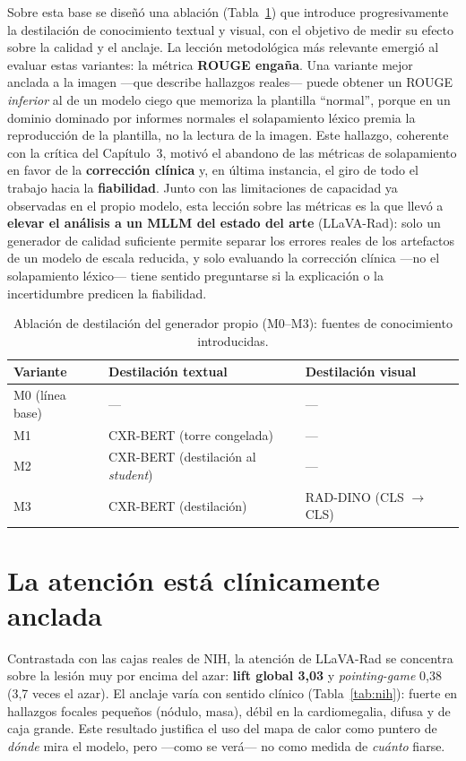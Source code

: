 Sobre esta base se diseñó una ablación (Tabla~\ref{tab:ablacion}) que introduce progresivamente la
destilación de conocimiento textual y visual, con el objetivo de medir su efecto sobre la calidad y el
anclaje. La lección metodológica más relevante emergió al evaluar estas variantes: la métrica
\textbf{ROUGE engaña}. Una variante mejor anclada a la imagen —que describe hallazgos reales— puede
obtener un ROUGE \emph{inferior} al de un modelo ciego que memoriza la plantilla ``normal'', porque en
un dominio dominado por informes normales el solapamiento léxico premia la reproducción de la
plantilla, no la lectura de la imagen. Este hallazgo, coherente con la crítica del Capítulo~3, motivó
el abandono de las métricas de solapamiento en favor de la \textbf{corrección clínica} y, en última
instancia, el giro de todo el trabajo hacia la \textbf{fiabilidad}. Junto con las limitaciones de
capacidad ya observadas en el propio modelo, esta lección sobre las métricas es la que llevó a
\textbf{elevar el análisis a un MLLM del estado del arte} (LLaVA-Rad): solo un generador de calidad
suficiente permite separar los errores reales de los artefactos de un modelo de escala reducida, y
solo evaluando la corrección clínica —no el solapamiento léxico— tiene sentido preguntarse si la
explicación o la incertidumbre predicen la fiabilidad.

\begin{table}[t]\centering
\caption{Ablación de destilación del generador propio (M0--M3): fuentes de conocimiento introducidas.}
\label{tab:ablacion}
\begin{tabular}{lll}
\toprule
Variante & Destilación textual & Destilación visual \\ \midrule
M0 (línea base) & --- & --- \\
M1 & CXR-BERT (torre congelada) & --- \\
M2 & CXR-BERT (destilación al \emph{student}) & --- \\
M3 & CXR-BERT (destilación) & RAD-DINO (CLS $\to$ CLS) \\ \bottomrule
\end{tabular}
\end{table}

\section{La atención está clínicamente anclada}
Contrastada con las cajas reales de NIH, la atención de LLaVA-Rad se concentra sobre la lesión muy
por encima del azar: \textbf{lift global 3,03} y \emph{pointing-game} 0,38 (3,7 veces el azar). El
anclaje varía con sentido clínico (Tabla~\ref{tab:nih}): fuerte en hallazgos focales pequeños
(nódulo, masa), débil en la cardiomegalia, difusa y de caja grande. Este resultado justifica el uso
del mapa de calor como puntero de \emph{dónde} mira el modelo, pero —como se verá— no como medida de
\emph{cuánto} fiarse.

